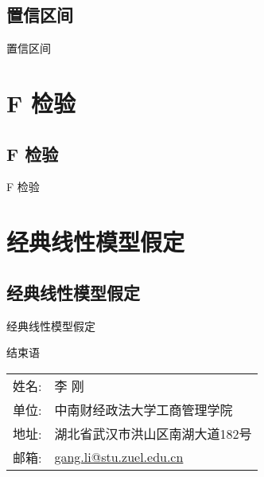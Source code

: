 \documentclass[UTF8]{ctexbeamer}
\begin{document}
\subsection{置信区间}
\begin{frame}{置信区间}
\end{frame}

\section{F 检验}
\subsection{F 检验}
\begin{frame}{F 检验}
\end{frame}

\section{经典线性模型假定}
\subsection{经典线性模型假定}
\begin{frame}{经典线性模型假定}
\end{frame}

\begin{frame}{结束语}
\linespread{1.25}
\begin{center}
\vspace{5mm}\large
\begin{tabular}{ll}
{\sc 姓名}:  & \textsf{李 刚}\\
{\sc 单位}: & 中南财经政法大学工商管理学院 \\
{\sc 地址}: & 湖北省武汉市洪山区南湖大道182号 \\
{\sc 邮箱}: & \href{mailto:gang.li@stu.zuel.edu.cn}{\color{blue}gang.li@stu.zuel.edu.cn}\\
\end{tabular}
\end{center}
\end{frame}
\end{document}
